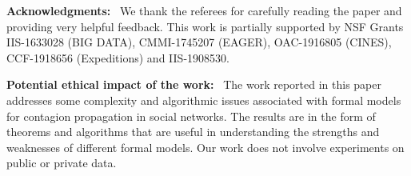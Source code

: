 \documentclass[letterpaper]{article} %
\begin{document}








%



%



% 

%



\clearpage


%
\noindent
\textbf{Acknowledgments:}~
We thank the referees for carefully reading
the paper and providing very helpful feedback.
This work is partially supported by NSF Grants  
IIS-1633028 (BIG DATA),
CMMI-1745207 (EAGER),
OAC-1916805 (CINES),
CCF-1918656 (Expeditions) and
IIS-1908530.

\bigskip

\noindent
\textbf{Potential ethical impact of the work:}~ 
The work reported in this paper addresses some complexity and algorithmic
issues associated with formal models for contagion
propagation in social networks.
The results are in the form of theorems and algorithms
that are useful in understanding the strengths and
weaknesses of different formal models.
Our work does not involve experiments on public or private data.

\bigskip


\end{document}
